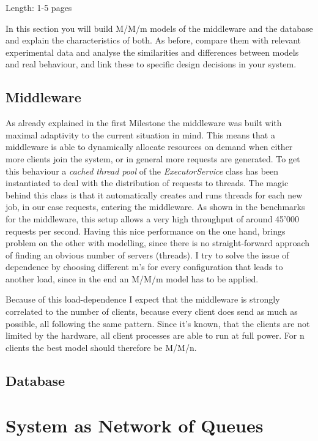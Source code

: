 \documentclass[11pt]{article}
\begin{document}
Length: 1-5 pages

In this section you will build M/M/m models of the middleware and the database and explain the characteristics of both. As before, compare them with relevant experimental data and analyse the similarities and differences between models and real behaviour, and link these to specific design decisions in your system.

\subsection{Middleware}
As already explained in the first Milestone the middleware was built with maximal adaptivity to the current situation in mind. This means that a middleware is able to dynamically allocate resources on demand when either more clients join the system, or in general more requests are generated. To get this behaviour a \textit{cached thread pool} of the \textit{ExecutorService} class has been instantiated to deal with the distribution of requests to threads. The magic behind this class is that it automatically creates and runs threads for each new job, in our case requests, entering the middleware. As shown in the benchmarks for the middleware, this setup allows a very high throughput of around 45'000 requests per second. Having this nice performance on the one hand, brings problem on the other with modelling, since there is no straight-forward approach of finding an obvious number of servers (threads). I try to solve the issue of dependence by choosing different m's for every configuration that leads to another load, since in the end an M/M/m model has to be applied. 

Because of this load-dependence I expect that the middleware is strongly correlated to the number of clients, because every client does send as much as possible, all following the same pattern. Since it's known, that the clients are not limited by the hardware, all client processes are able to run at full power. For n clients the best model should therefore be M/M/n.

\subsection{Database}

\section{System as Network of Queues}\label{sec:network-of-queues}
\end{document}
